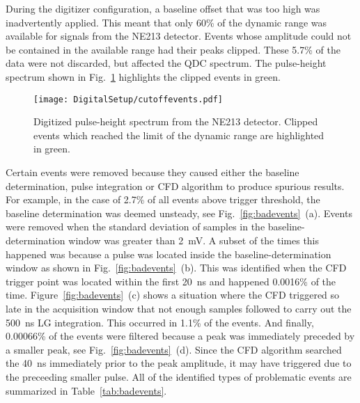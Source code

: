 \documentclass[main.tex]{subfiles}
\begin{document}
During the digitizer configuration, a baseline offset that was too high was inadvertently applied. This meant that only 60\% of the dynamic range was available for signals from the NE213 detector. Events whose amplitude could not be contained in the available range had their peaks clipped. These 5.7\% of the data were not discarded, but affected the QDC spectrum. The pulse-height spectrum shown in Fig.~\ref{fig:cutoffevents} highlights the clipped events in green.
\begin{figure}[hb!]
    \centering
        \texttt{[image: DigitalSetup/cutoffevents.pdf]}
        \caption[Digitized pulse-height spectrum from the NE213 detector.]{Digitized pulse-height spectrum from the NE213 detector. Clipped events which reached the limit of the dynamic range are highlighted in green.}
    \label{fig:cutoffevents} 
\end{figure}

Certain events were removed because they caused either the baseline determination, pulse integration or CFD algorithm to produce spurious results. For example, in the case of 2.7\% of all events above trigger threshold, the baseline determination was deemed unsteady, see Fig.~\ref{fig:badevents}~(a). Events were removed when the standard deviation of samples in the baseline-determination window was greater than \SI{2}{mV}. A subset of the times this happened was because a pulse was located inside the baseline-determination window as shown in Fig.~\ref{fig:badevents}~(b). This was identified when the CFD trigger point was located within the first \SI{20}{ns} and happened 0.0016\% of the time. Figure~\ref{fig:badevents}~(c) shows a situation where the CFD triggered so late in the acquisition window that not enough samples followed to carry out the \SI{500}{\nano\second} LG integration. This occurred in 1.1\% of the events. And finally, 0.00066\% of the events were filtered because a peak was immediately  preceded by a smaller peak, see Fig.~\ref{fig:badevents}~(d). Since the CFD algorithm searched the \SI{40}{ns} immediately prior to the peak amplitude, it may have triggered due to the preceeding smaller pulse. All of the identified types of problematic events are summarized in Table~\ref{tab:badevents}.
\end{document}
